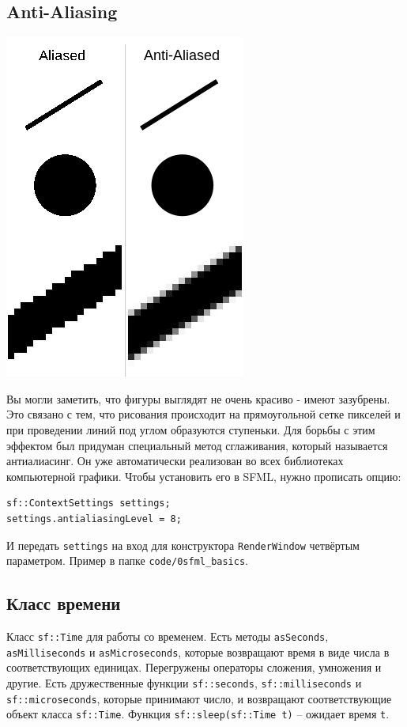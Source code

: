 \documentclass{article}
\begin{document}
\newpage
\subsection*{Anti-Aliasing}
\begin{multicols}{2}
\begin{center}
\includegraphics[scale=0.5]{../images/anti-aliasing.png}
\end{center}
Вы могли заметить, что фигуры выглядят не очень красиво - имеют зазубрены. Это связано с тем, что рисования происходит на прямоугольной сетке пикселей и при проведении линий под углом образуются ступеньки. Для борьбы с этим эффектом был придуман специальный метод сглаживания, который называется антиалиасинг. Он уже автоматически реализован во всех библиотеках компьютерной графики. Чтобы установить его в SFML, нужно прописать опцию:
\begin{lstlisting}
sf::ContextSettings settings;
settings.antialiasingLevel = 8;
\end{lstlisting}
И передать \texttt{settings} на вход для конструктора \texttt{RenderWindow} четвёртым параметром. Пример в папке \texttt{code/0sfml\_basics}.
\end{multicols}


\subsection*{Класс времени}
Класс \texttt{sf::Time} для работы со временем. Есть методы \texttt{asSeconds}, \texttt{asMilliseconds} и \texttt{asMicroseconds}, которые возвращают время в виде числа в соответствующих единицах. Перегружены операторы сложения, умножения и другие. Есть дружественные функции \texttt{sf::seconds}, \texttt{sf::milliseconds} и \texttt{sf::microseconds}, которые принимают число, и возвращают соответствующие объект класса \texttt{sf::Time}. Функция \texttt{sf::sleep(sf::Time t)} -- ожидает время \texttt{t}.
\end{document}
